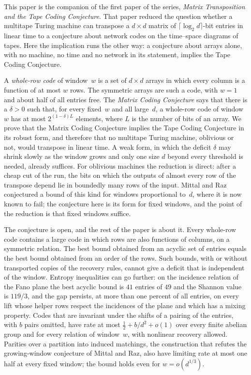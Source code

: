This paper is the companion of the first paper of the series, \emph{Matrix Transposition and the Tape Coding
Conjecture}. That paper reduced the question whether a multitape Turing machine can transpose a $d\times d$ matrix of
$\lceil\log_2d\rceil$-bit entries in linear time to a conjecture about network codes on the time--space diagrams of
tapes. Here the implication runs the other way: a conjecture about arrays alone, with no machine, no time and no
network in its statement, implies the Tape Coding Conjecture.

A \emph{whole-row code} of window~$w$ is a set of $d\times d$ arrays in which every column is a function of at most
$w$ rows. The symmetric arrays are such a code, with $w=1$ and about half of all entries free. The \emph{Matrix Coding
Conjecture} says that there is a $\delta>0$ such that, for every fixed~$w$ and all large~$d$, a whole-row code of
window~$w$ has at most $2^{(1-\delta)L}$ elements, where $L$ is the number of bits of an array. We prove that the
Matrix Coding Conjecture implies the Tape Coding Conjecture in its robust form, and therefore that no multitape Turing
machine, oblivious or not, would transpose in linear time. A weak form, in which the deficit $\delta$ may shrink slowly
as the window grows and only one size $d$ beyond every threshold is needed, already suffices. For oblivious machines the
reduction is direct: after a cheap cut of the run, the bits on which the outputs of almost every row of the transpose
depend lie in boundedly many rows of the input. Mittal and Raz conjectured a bound of this kind for windows
proportional to~$d$, where it is now known to fail; the conjecture here is its form for fixed windows, and the point of
the reduction is that fixed windows suffice.

The conjecture is open, and the rest of the paper is about it. Every whole-row code contains a large code in which rows
are also functions of columns, on a symmetric relation. The best bound obtained from an acyclic set of entries equals
the best bound obtained from an order of the rows. Such bounds, with or without transported copies of the recovery
rules, cannot give a deficit that is independent of the window. Entropy inequalities can go further: on the incidence relation of the
Fano plane the best acyclic bound is $41$ entries of $49$ and the Shannon value is $119/3$, and the gap persists, at more
than one percent of all entries, on every lift whose helper rows respect the incidences of the plane and which has a
mixing property. Codes that are invariant under the shifts of a
pairing of the entries, with $b$ pairs omitted, have rate at most $\tfrac12+b/d^2+o(1)$ over every finite abelian group
and for every relation of window~$w$, with nonlinear recovery allowed. Parities over a partition into induced
matchings, the construction that refutes the growing-window conjecture of Mittal and Raz, also have limiting rate at most
one half at every fixed window; the bound holds even for $w=o(d^{1/3})$.

